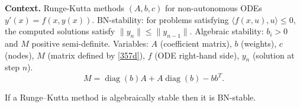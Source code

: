 \noindent\textbf{Context.}
Runge-Kutta methods $(A,b,c)$ for non-autonomous ODEs $y'(x)=f(x,y(x))$.
BN-stability: for problems satisfying $\langle f(x,u),u\rangle\le0$, the computed solutions satisfy $\|y_n\|\le\|y_{n-1}\|$.
Algebraic stability: $b_i>0$ and $M$ positive semi-definite.
Variables: $A$ (coefficient matrix), $b$ (weights), $c$ (nodes), $M$ (matrix defined by \eqref{357d}), $f$ (ODE right-hand side), $y_n$ (solution at step $n$).
\begin{equation}\label{357d}
M=\operatorname{diag}(b)A+A\operatorname{diag}(b)-bb^{T}.
\end{equation}

\begin{theorem}

  \label{thm:357C}
If a Runge--Kutta method is algebraically stable then it is BN-stable.
\end{theorem}


